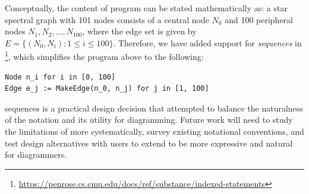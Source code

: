 Conceptually, the content of \Substance{} program can be stated mathematically as: a star spectral graph with 101 nodes consists of a central node \( N_0 \) and 100 peripheral nodes \( N_1, N_2, \dots, N_{100} \), where the edge set is given by \( E = \{(N_0, N_i) : 1 \leq i \leq 100\} \). Therefore, we have added support for \emph{sequences} in \Substance{}\footnote{\url{https://penrose.cs.cmu.edu/docs/ref/substance/indexed-statements}}, which simplifies the program above to the following:

\vspace{1em}
\begin{mdframed}[style=SUBCode]
\begin{lstlisting}[language=Sub-graph,escapechar=@]
Node n_i for i in [0, 100]
Edge e_j := MakeEdge(n_0, n_j) for j in [1, 100]
\end{lstlisting}
\end{mdframed}
\vspace{1em}

\Substance{} sequences is a practical design decision that attempted to balance the naturalness of the \Substance{} notation and its utility for diagramming. Future work will need to study the limitations of \Substance{} more systematically, survey existing notational conventions, and test design alternatives with users to extend \Substance{} to be more expressive and natural for diagrammers. 


